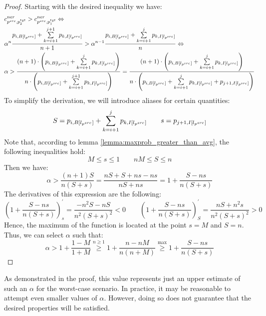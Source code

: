 \begin{proof}
  Starting with the desired inequality we have:
  \begin{align*}
    & c_{p^{src}, p_2^{tgt}}^{ner} > c_{p^{src}, p_1^{tgt}}^{ner} \Leftrightarrow \\
    & \alpha^{n}
    \frac{
      p_{i, B[l_{p^{src}}]} +
      \sum\limits_{k = i + 1}^{j + 1} p_{k, I[l_{p^{src}}]}
    }
    {n + 1} >
    \alpha^{n - 1}
    \frac{
      p_{i, B[l_{p^{src}}]} +
      \sum\limits_{k = i + 1}^{j} p_{k, I[l_{p^{src}}]}
    }
    {n}
    \Leftrightarrow                                                                \\
    & \alpha >
    \frac
    {(n+1) \cdot \left( p_{i, B[l_{p^{src}}]} +
    \sum\limits_{k = i + 1}^{j} p_{k, I[l_{p^{src}}]} \right)}
    {
      n \cdot \left( p_{i, B[l_{p^{src}}]} +
    \sum\limits_{k = i + 1}^{j + 1} p_{k, I[l_{p^{src}}]} \right)}
    =
    \frac
    {(n+1) \cdot \left( p_{i, B[l_{p^{src}}]} +
    \sum\limits_{k = i + 1}^{j} p_{k, I[l_{p^{src}}]} \right)}
    {
      n \cdot \left( p_{i, B[l_{p^{src}}]} +
    \sum\limits_{k = i + 1}^{j} p_{k, I[l_{p^{src}}]} + p_{j+1, I[l_{p^{src}}]} \right)}
  \end{align*}
  To simplify the derivation, we will introduce aliases for certain quantities:
  \[
    S = p_{i, B[l_{p^{src}}]}  + \sum\limits_{k = i + 1}^{j} p_{k, I[l_{p^{src}}]} \qquad
    s = p_{j+1, I[l_{p^{src}}]}
  \]
  Note that, according to lemma \ref{lemma:maxprob_greater_than_avg},
  the following inequalities hold:
  \begin{equation} \label{eq:ner_sum_ineq}
    M \leq s \leq 1 \qquad nM \leq S \leq n
  \end{equation}
  Then we have:
  \begin{equation*}
    \alpha > \frac{(n + 1) S}{n (S + s)} =
    \frac{nS + S + ns - ns}{nS + ns} =
    1 + \frac{S - ns}{n(S + s)}
  \end{equation*}
  The derivatives of this expression are the following:
  \begin{equation*}
    \left( 1 + \frac{S - ns}{n(S + s)} \right)_s^{'} =
    \frac{-n^2S - nS}{n^2 (S + s)^2} < 0
    \qquad
    \left( 1 + \frac{S - ns}{n(S + s)} \right)_S^{'}
    = \frac{nS + n^2s}{n^2 (S + s)^2} > 0
  \end{equation*}
  Hence, the maximum of the function is located at the point \( s = M \) and
  \( S = n \). Thus, we can select \( \alpha \) such that:
  \begin{equation*}
    \alpha > 1 + \frac{1 - M}{1 + M}
    \stackrel{n \geq 1}{\geq}
    1 + \frac{n - nM}{n(n + M)}
    \stackrel{\max}{\geq}
    1 + \frac{S - ns}{n(S + s)}
  \end{equation*}
\end{proof}
As demonstrated in the proof, this value represents just an upper estimate of such an
\( \alpha \) for the worst-case scenario. In practice, it may be reasonable to attempt
even smaller values of \( \alpha \). However, doing so does not guarantee that the
desired properties will be satisfied.

